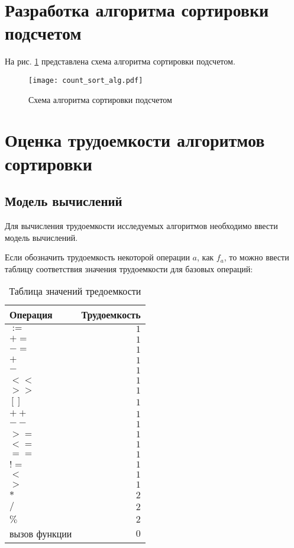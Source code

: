 \section{Разработка алгоритма сортировки подсчетом}
На рис. \ref{img:count_sort_alg} представлена схема алгоритма сортировки подсчетом.

\begin{figure}[h!]
\centering
    \texttt{[image: count\_sort\_alg.pdf]}
    \caption{Схема алгоритма сортировки подсчетом}
    \label{img:count_sort_alg}	
\end{figure}

\section{Оценка трудоемкости алгоритмов сортировки}

\subsection{Модель вычислений}
Для вычисления трудоемкости исследуемых алгоритмов необходимо ввести модель вычислений. 

Если обозначить трудоемкость некоторой операции $a$, как $f_a$, то можно ввести таблицу соответствия значения трудоемкости для базовых операций:


\begin{table}[h]
  \caption{\label{table:complexity} Таблица значений тредоемкости}
  \begin{center}
    \begin{tabular}{|l|r|}
      \hline
      Операция & Трудоемкость\\ \hline
      $:=$ & $1$ \\ \hline
      $+=$ & $1$ \\ \hline
      $-=$ & $1$ \\ \hline
      $+$ & $1$ \\ \hline
      $-$ & $1$ \\ \hline
      $<<$ & $1$ \\ \hline
      $>>$ & $1$ \\ \hline
      $[]$ & $1$ \\ \hline
      $++$ & $1$ \\ \hline
      $--$ & $1$ \\ \hline
      $>=$ & $1$ \\ \hline
      $<=$ & $1$ \\ \hline
      $==$ & $1$ \\ \hline
      $!=$ & $1$ \\ \hline
      $<$ & $1$ \\ \hline
      $>$ & $1$ \\ \hline
      $*$ & $2$ \\ \hline
      $/$ & $2$ \\ \hline
      $\%$ & $2$ \\ \hline
      вызов функции & $0$ \\ \hline
    \end{tabular}
  \end{center}
\end{table}

